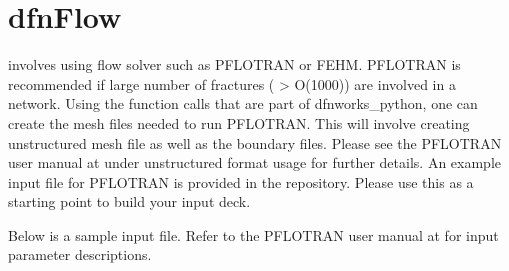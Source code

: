 \documentclass[letterpaper,10pt,english]{sphinxmanual}
\begin{document}
\begin{sphinxVerbatim}[commandchars=\\\{\}]
 

   

\end{sphinxVerbatim}


\chapter{dfnFlow}
\label{\detokenize{dfnflow:dfnflow}}\label{\detokenize{dfnflow::doc}}\label{\detokenize{dfnflow:dfnflow-chapter}}
 involves using flow solver such as PFLOTRAN or FEHM. PFLOTRAN is recommended if large number of fractures ( \textgreater{} O(1000)) are involved in a network. Using the function calls that are part of dfnworks\_python, one can create the mesh files needed to run PFLOTRAN. This will involve creating unstructured mesh file  as well as the boundary   files. Please see the PFLOTRAN user manual at  under unstructured  format usage for further details. An example input file for PFLOTRAN is provided in the repository. Please use this as a starting point to build your input deck.

Below is a sample input file. Refer to the PFLOTRAN user manual at  for input parameter descriptions.
\end{document}
